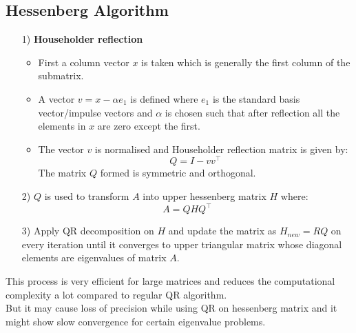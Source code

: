 \documentclass[12pt]{article}
\begin{document}
\subsection{Hessenberg Algorithm}
\begin{enumerate}
    \item[1)] \textbf{Householder reflection}\\
    \begin{itemize}
        \item First a column vector $x$ is taken which is generally the first column of the submatrix.
        \item A vector $v= x - \alpha e_1$ is defined where $e_1$ is the standard basis vector/impulse vectors and $\alpha$ is chosen such that after reflection all the elements in $x$ are zero except the first.
        \item The vector $v$ is normalised and Householder reflection matrix is given by:
        $$Q = I - vv^\top$$
        The matrix $Q$ formed is symmetric and orthogonal.
    \end{itemize}
    \item[2)] $Q$ is used to transform $A$ into upper hessenberg matrix $H$ where:
    $$A = QHQ^\top$$
    \item[3)] Apply QR decomposition on $H$ and update the matrix as $H_{new} = RQ$ on every iteration until it converges to upper triangular matrix whose diagonal elements are eigenvalues of matrix $A$.
\end{enumerate}
    This process is very efficient for large matrices and reduces the computational complexity a lot compared to regular QR algorithm.\\
    But it may cause loss of precision while using QR on hessenberg matrix and it might show slow convergence for certain eigenvalue problems.
\end{document}
